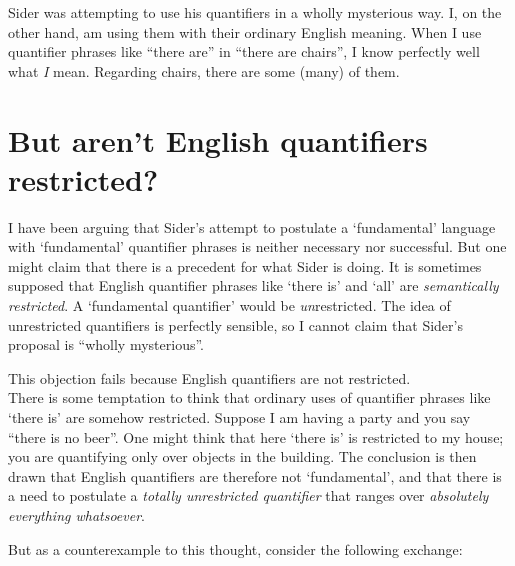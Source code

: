 \documentclass[11pt]{article}
\begin{document}
\begin{spacing}{1.25}
Sider was attempting to use his quantifiers in a wholly mysterious
way.  I, on the other hand, am using them with their ordinary English
meaning.  When I use quantifier phrases like ``there are'' in ``there
are chairs'', I know perfectly well what {\em I} mean.  Regarding
chairs, there are some (many) of them.


\section{But aren't English quantifiers restricted?}
\label{eng-quant}
I have been arguing that Sider's attempt to postulate a `fundamental'
language with `fundamental' quantifier phrases is neither necessary
nor successful.  But one might claim that there is a precedent for
what Sider is doing.  It is sometimes supposed that English quantifier
phrases like `there is' and `all' are {\em semantically restricted}.
A `fundamental quantifier' would be {\em un}restricted.  The idea of
unrestricted quantifiers is perfectly sensible, so I cannot claim that
Sider's proposal is ``wholly mysterious''.

This objection fails because English quantifiers are not
restricted. \\

There is some temptation to think that ordinary uses of quantifier
phrases like `there is' are somehow restricted.  Suppose I am having a
party and you say ``there is no beer''.  One might think that here
`there is' is restricted to my house; you are quantifying only over
objects in the building.  The conclusion is then drawn that English
quantifiers are therefore not `fundamental', and that there is a need
to postulate a {\em totally unrestricted quantifier} that ranges over
{\em absolutely everything whatsoever}.

But as a counterexample to this thought, consider the following
exchange:



\end{spacing}
\end{document}
